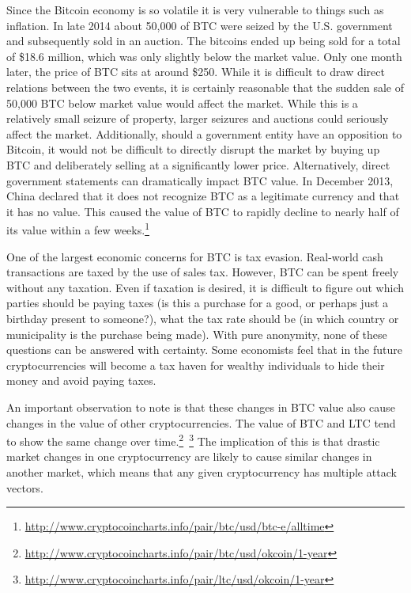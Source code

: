 \documentclass[11pt]{article}
\begin{document}
Since the Bitcoin economy is so volatile it is very vulnerable to things such as inflation. In late 2014 about 50,000
of BTC were seized by the U.S. government and subsequently sold in an auction.\cite{reutersgov} The bitcoins ended up
being sold for a total of \$18.6 million, which was only slightly below the market value. Only one month later, the
price of BTC sits at around \$250. While it is difficult to draw direct relations between the two events, it is
certainly reasonable that the sudden sale of 50,000 BTC below market value would affect the market. While this is a
relatively small seizure of property, larger seizures and auctions could seriously affect the market. Additionally,
should a government entity have an opposition to Bitcoin, it would not be difficult to directly disrupt the market by
buying up BTC and deliberately selling at a significantly lower price. Alternatively, direct government statements can
dramatically impact BTC value. In December 2013, China declared that it does not recognize BTC as a legitimate currency
and that it has no value. This caused the value of BTC to rapidly decline to nearly half of its value within a few
weeks.\footnote{\url{http://www.cryptocoincharts.info/pair/btc/usd/btc-e/alltime}}

One of the largest economic concerns for BTC is tax evasion. Real-world cash transactions are taxed by the use of sales
tax. However, BTC can be spent freely without any taxation. Even if taxation is desired, it is difficult to figure out
which parties should be paying taxes (is this a purchase for a good, or perhaps just a birthday present to someone?),
what the tax rate should be (in which country or municipality is the purchase being made). With pure anonymity, none of
these questions can be answered with certainty. Some economists feel that in the future cryptocurrencies will become a
tax haven for wealthy individuals to hide their money and avoid paying taxes.\cite{marian2013}

An important observation to note is that these changes in BTC value also cause changes in the value of other
cryptocurrencies. The value of BTC and LTC tend to show the same change over time.\footnote{\url{http://www.cryptocoincharts.info/pair/btc/usd/okcoin/1-year}}~\footnote{\url{http://www.cryptocoincharts.info/pair/ltc/usd/okcoin/1-year}}
The implication of this is that drastic market changes in one cryptocurrency are likely to cause similar changes in
another market, which means that any given cryptocurrency has multiple attack vectors.
\end{document}
